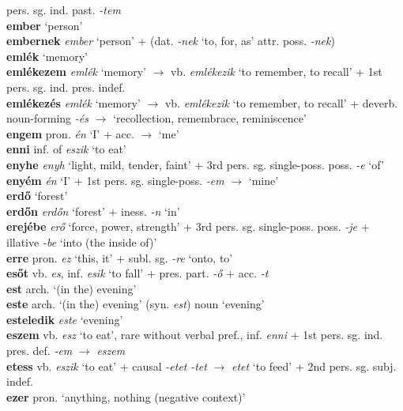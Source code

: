\documentclass[11pt]{article}
\begin{document}
pers. sg. ind. past. \emph{-tem} \\
\textbf{ember} `person' \\
\textbf{embernek} \emph{ember} `person' + (dat. \emph{-nek} `to,
for, as' \textbar\textbar{} attr. poss. \emph{-nek}) \\
\textbf{emlék} `memory' \\
\textbf{emlékezem} \emph{emlék} `memory' $\rightarrow$
vb. \emph{emlékezik} `to remember, to recall' + 1st
pers. sg. ind. pres. indef. \\
\textbf{emlékezés} \emph{emlék} `memory' $\rightarrow$
vb. \emph{emlékezik} `to remember, to recall' +
deverb. noun\hyp{}forming \emph{-és} $\rightarrow$ `recollection,
remembrace, reminiscence' \\
\textbf{engem} pron. \emph{én} `I' + acc. $\rightarrow$ `me' \\
\textbf{enni} inf. of \emph{eszik} `to eat' \\
\textbf{enyhe} \emph{enyh} `light, mild, tender, faint' + 3rd
pers. sg. single\hyp{}poss. poss. \emph{-e} `of' \\
\textbf{enyém} \emph{én} `I' + 1st
pers. sg. single\hyp{}poss. \emph{-em} $\rightarrow$ `mine' \\
\textbf{erdő} `forest' \\
\textbf{erdőn} \emph{erdőn} `forest' + iness. \emph{-n} `in' \\
\textbf{erejébe} \emph{erő} `force, power, strength' + 3rd
pers. sg. single\hyp{}poss. poss. \emph{-je} + illative \emph{-be}
`into (the inside of)' \\
\textbf{erre} pron. \emph{ez} `this, it' + subl. sg. \emph{-re} `onto,
to' \\
\textbf{esőt} vb. \emph{es}, inf. \emph{esik} `to fall' + pres. part. \emph{-ő} + acc. \emph{-t} \\
\textbf{est} arch. `(in the) evening' \\
\textbf{este} arch.  `(in the) evening'
(syn. \emph{est}) \textbar\textbar{} noun `evening' \\
\textbf{esteledik} \emph{este} `evening' \\
\textbf{eszem} vb. \emph{esz} `to eat', rare without verbal pref.,
inf. \emph{enni} + 1st pers. sg. ind. pres. def. \emph{-em}
  $\rightarrow$ \emph{eszem} \\
\textbf{etess} vb. \emph{eszik} `to eat' +
  causal \emph{-etet} \emph{-tet} $\rightarrow$ \emph{etet} `to feed'
  + 2nd pers. sg. subj. indef. \\
\textbf{ezer} pron. `anything, nothing (negative context)' \\
\end{document}
